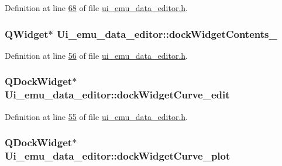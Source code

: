 Definition at line \hyperlink{a00051_source_l00068}{68} of file \hyperlink{a00051_source}{ui\+\_\+emu\+\_\+data\+\_\+editor.\+h}.

\hypertarget{a00026_a20ad5110f0fb7b329d067d354f8c9409}{
\subsubsection[{dock\+Widget\+Contents\+\_\+4}]{\setlength{\rightskip}{0pt plus 5cm}Q\+Widget$\ast$ Ui\+\_\+emu\+\_\+data\+\_\+editor\+::dock\+Widget\+Contents\+\_}}\label{a00026_a20ad5110f0fb7b329d067d354f8c9409}


Definition at line \hyperlink{a00051_source_l00056}{56} of file \hyperlink{a00051_source}{ui\+\_\+emu\+\_\+data\+\_\+editor.\+h}.

\hypertarget{a00026_a83360bdd61e994537715aa7c38e4e5b6}{
\subsubsection[{dock\+Widget\+Curve\+\_\+edit}]{\setlength{\rightskip}{0pt plus 5cm}Q\+Dock\+Widget$\ast$ Ui\+\_\+emu\+\_\+data\+\_\+editor\+::dock\+Widget\+Curve\+\_\+edit}}\label{a00026_a83360bdd61e994537715aa7c38e4e5b6}


Definition at line \hyperlink{a00051_source_l00055}{55} of file \hyperlink{a00051_source}{ui\+\_\+emu\+\_\+data\+\_\+editor.\+h}.

\hypertarget{a00026_a0edc87fb115fede171c0da1f99000874}{
\subsubsection[{dock\+Widget\+Curve\+\_\+plot}]{\setlength{\rightskip}{0pt plus 5cm}Q\+Dock\+Widget$\ast$ Ui\+\_\+emu\+\_\+data\+\_\+editor\+::dock\+Widget\+Curve\+\_\+plot}}\label{a00026_a0edc87fb115fede171c0da1f99000874}


